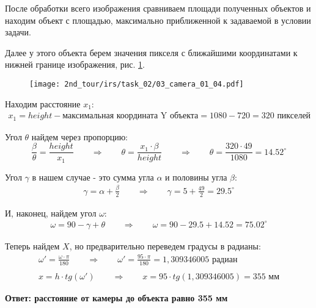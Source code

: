 После обработки всего изображения сравниваем площади полученных объектов и находим объект с площадью, максимально приближенной к задаваемой в условии задачи.

Далее у этого объекта берем значения пикселя с ближайшими координатами к нижней границе изображения, рис. \ref{fig:03_camera_01_04}.
\\
\begin{figure}[h!]
	\centering
	\texttt{[image: 2nd\_tour/irs/task\_02/03\_camera\_01\_04.pdf]}
	\caption{}
	\label{fig:03_camera_01_04}
\end{figure}

Находим расстояние $x_1$:
\begin{align*}
x_1 = height - \text{максимальная координата Y объекта} = 1080 - 720 = 320 \text{ пикселей}
\end{align*}

Угол $\theta$ найдем через пропорцию:
\begin{equation*}
\frac{\beta}{\theta} = \frac{height}{x_1} \qquad \Rightarrow \qquad \theta = \frac{x_1 \cdot \beta}{height} \qquad \Rightarrow \qquad \theta = \frac{320 \cdot 49}{1080} = 14.52 ^\circ
\end{equation*}

Угол $\gamma$ в нашем случае - это сумма угла $\alpha$ и половины угла $\beta$:
\begin{align*}
\gamma = \alpha + \frac{\beta}{2} \qquad \Rightarrow \qquad \gamma = 5 +  \frac{49}{2} = 29.5^\circ
\end{align*}

И, наконец, найдем угол $\omega$:
\begin{align*}
\omega = 90 - \gamma + \theta \qquad \Rightarrow \qquad \omega = 90 - 29.5 + 14.52 = 75.02^\circ
\end{align*}

Теперь найдем $X$, но предварительно переведем градусы в радианы:
\begin{align*}
\omega' = \frac{\omega \cdot \pi}{180} \qquad \Rightarrow \qquad \omega' = \frac{95 \cdot \pi}{180} = 1,309346005 \text{ радиан} \\ \\
x = h \cdot tg(\omega') \qquad \Rightarrow \qquad x = 95 \cdot tg(1,309346005) = 355 \text{ мм}
\end{align*}

\textbf{Ответ: расстояние от камеры до объекта равно 355 мм}

\codeExample

